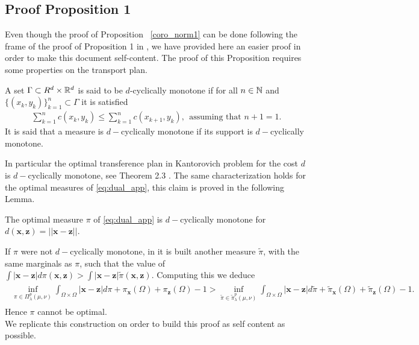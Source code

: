 \subsection{Proof Proposition 1}
\indent 
Even though the proof of Proposition~ \ref{coro_norm1} can be done following the frame of the proof of  Proposition 1 in \cite{gulrajani2017improved}, we have provided here   an easier proof  in order to make this document  self-content.  The proof of this Proposition requires some properties on the transport plan.
\begin{Definition}\label{def:c_ci}
A set $\Gamma\subset R^d\times \mathbb{R}^d$ is said to be $d$-cyclically monotone if for all $n\in \mathbb{N}$ and $\{(x_k,y_k)\}_{k=1}^{n} \subset \Gamma $ it is satisfied 
\begin{align}
	\sum_{k=1}^n c(x_k,y_k)\leq \sum_{k=1}^n c(x_{k+1},y_k), \ \ \text{assuming that  $n+1=1$}. 
\end{align}
It is said that a measure is  $d-$cyclically monotone if its support is  $d-$cyclically monotone.
\end{Definition}
In particular the optimal transference plan in Kantorovich problem for the cost $d$ is $d-$cyclically monotone, see Theorem 2.3 \cite{GaMc}. The same characterization holds for the optimal measures of \eqref{eq:dual_app}, this claim is proved in the following Lemma.
\begin{Lemma}\label{lem:d_mono}
The optimal measure $\pi$ of \eqref{eq:dual_app} is $d-$cyclically monotone for $d(\textbf{x},\textbf{z})=||\textbf{x}-\textbf{z} ||$.
\end{Lemma}
If $\pi$ were not $d-$cyclically monotone, in \cite{villani2008} it is built another measure $\tilde{\pi}$, with the same marginals as $\pi$, such that the value of $\int |\textbf{x}-\textbf{z}|d\pi(\textbf{x},\textbf{z})>\int |\textbf{x}-\textbf{z}|\tilde{\pi}(\textbf{x},\textbf{z})$. Computing this we deduce
\begin{align*}
\begin{split}
	\inf_{\pi \in\Pi^p_{\lambda}(\mu, \nu)}\int_{\Omega\times \Omega}|{\textbf{x}}-{{\textbf{z}}} |d\pi + \pi_{\textbf{x}}(\Omega)+\pi_{{\textbf{z}}}(\Omega)-1> \inf_{\tilde{\pi} \in\tilde{\pi}^p_{\lambda}(\mu, \nu)}\int_{\Omega\times \Omega}|{\textbf{x}}-{{\textbf{z}}} |d\tilde{\pi} + \tilde{\pi}_{\textbf{x}}(\Omega)+\tilde{\pi}_{{\textbf{z}}}(\Omega)-1.
	\end{split}
\end{align*}
Hence $\pi$ cannot be optimal. \\
We replicate this construction on order to build this proof as self content as possible.\\ 
